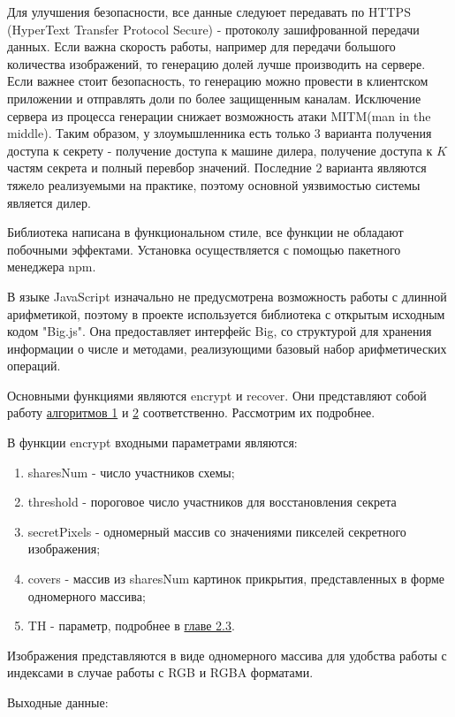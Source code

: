 \documentclass[a4paper,article,14pt]{extarticle}
\begin{document}
Для улучшения безопасности, все данные следуюет передавать по HTTPS (HyperText Transfer Protocol Secure) - протоколу зашифрованной передачи данных.
Если важна скорость работы, например для передачи большого количества изображений, то генерацию долей лучше производить на сервере. 
Если важнее стоит безопасность, то генерацию можно провести в клиентском приложении и отправлять доли по более защищенным каналам.
Исключение сервера из процесса генерации снижает возможность атаки MITM(man in the middle). Таким образом, у злоумышленника есть
только 3 варианта получения доступа к секрету - получение доступа к машине дилера, получение доступа к $K$ частям секрета и полный перевбор значений.
Последние 2 варианта являются тяжело реализуемыми на практике, поэтому основной уязвимостью системы является дилер.

Библиотека написана в функциональном стиле, все функции не обладают побочными эффектами.
Установка осуществляется с помощью пакетного менеджера npm.

В языке JavaScript изначально не предусмотрена возможность работы с длинной арифметикой, поэтому в проекте используется библиотека
с открытым исходным кодом "Big.js". Она предоставляет интерфейс Big, со структурой для хранения информации о числе и методами, 
реализующими базовый набор арифметических операций.

Основными функциями являются encrypt и recover. Они представляют собой работу \hyperlink{generation_alg}{алгоритмов 1} и \hyperlink{recover_alg}{2} соответственно. 
Рассмотрим их подробнее.

В функции encrypt входными параметрами являются:
\begin{enumerate}[leftmargin=2cm]
    \item sharesNum - число участников схемы;
    \item threshold - пороговое число участников для восстановления секрета
    \item secretPixels - одномерный массив со значениями пикселей секретного изображения;
    \item covers - массив из sharesNum картинок прикрытия, представленных в форме одномерного массива;
    \item TH - параметр, подробнее в \hyperlink{comments}{главе 2.3}.
\end{enumerate}
Изображения представляются в виде одномерного массива для удобства работы с индексами в случае работы с RGB и RGBA форматами.

Выходные данные:
\end{document}

